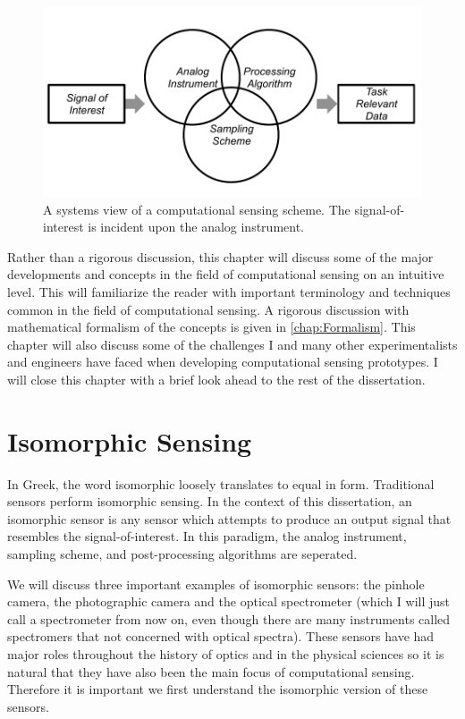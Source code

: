 \begin{figure}
    \centering
    \includegraphics[scale=1]{computationalsensingflowchart}
    \caption{A systems view of a computational sensing scheme. The signal-of-interest is incident upon the analog instrument.  }
    \label{fig:computationalsensingflowchart}
\end{figure}


Rather than a rigorous discussion, this chapter will discuss some of the major developments and concepts in the field of computational sensing on an intuitive level. This will familiarize the reader with important terminology and techniques common in the field of computational sensing. A rigorous discussion with mathematical formalism of the concepts is given in \autoref{chap:Formalism}. This chapter will also discuss some of the challenges I and many other experimentalists and engineers have faced when developing computational sensing prototypes. I will close this chapter with a brief look ahead to the rest of the dissertation. 


\section{Isomorphic Sensing}\label{sec:Isomorphic Sensing}

In Greek, the word isomorphic loosely translates to equal in form. Traditional sensors perform isomorphic sensing. In the context of this dissertation, an isomorphic sensor is any sensor which attempts to produce an output signal that resembles the signal-of-interest. In this paradigm, the analog instrument, sampling scheme, and post-processing algorithms are seperated.

We will discuss three important examples of isomorphic sensors: the pinhole camera, the photographic camera and the optical spectrometer (which I will just call a spectrometer from now on, even though there are many instruments called spectromers that not concerned with optical spectra). These sensors have had major roles throughout the history of optics and in the physical sciences so it is natural that they have also been the main focus of computational sensing. Therefore it is important we first understand the isomorphic version of these sensors.

